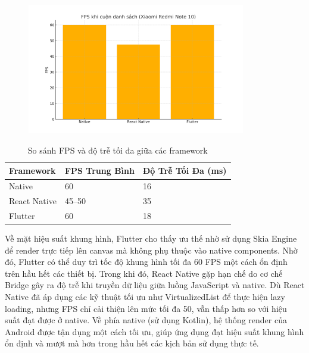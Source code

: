 \begin{figure}[H]
    \centering
    \includegraphics[width=0.85\textwidth]{images/performance_chart.png}
\end{figure}

\vspace{0.5em}

\begin{table}[H]
  \centering
  \begin{tabular}{|l|p{5cm}|p{5cm}|}
  \hline
  \textbf{Framework} & \textbf{FPS Trung Bình} & \textbf{Độ Trễ Tối Đa (ms)} \\
  \hline
  Native       & 60          & 16 \\
  React Native & 45--50      & 35 \\
  Flutter      & 60          & 18 \\
  \hline
  \end{tabular}
  \caption{So sánh FPS và độ trễ tối đa giữa các framework}
  \end{table}
  
  
    \hspace*{0.8cm}Về mặt hiệu suất khung hình, Flutter cho thấy ưu thế nhờ sử dụng Skia Engine để render trực tiếp lên canvas mà không phụ thuộc vào native components. Nhờ đó, Flutter có thể duy trì tốc độ khung hình tối đa 60 FPS một cách ổn định trên hầu hết các thiết bị. Trong khi đó, React Native gặp hạn chế do cơ chế Bridge gây ra độ trễ khi truyền dữ liệu giữa luồng JavaScript và native. Dù React Native đã áp dụng các kỹ thuật tối ưu như VirtualizedList để thực hiện lazy loading, nhưng FPS chỉ cải thiện lên mức tối đa 50, vẫn thấp hơn so với hiệu suất đạt được ở native. Về phía native (sử dụng Kotlin), hệ thống render của Android được tận dụng một cách tối ưu, giúp ứng dụng đạt hiệu suất khung hình ổn định và mượt mà hơn trong hầu hết các kịch bản sử dụng thực tế.
  \vspace{0.5em}
  


